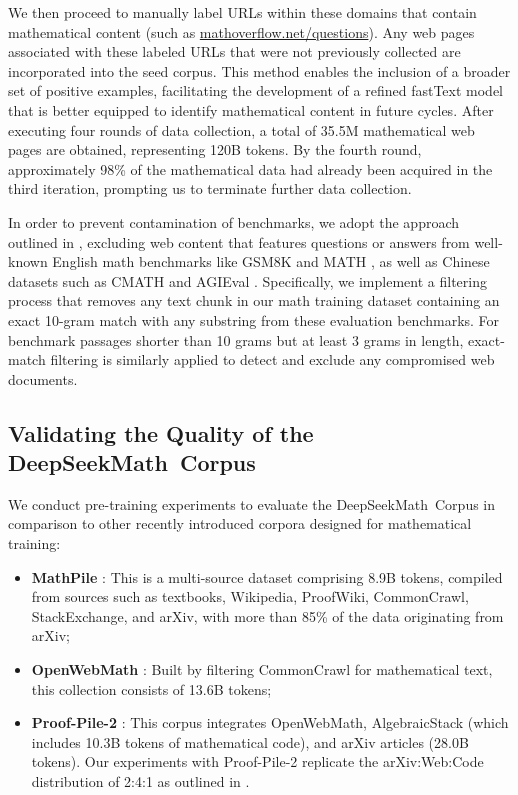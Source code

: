 \begin{itemize}[topsep=0pt]
We then proceed to manually label URLs within these domains that contain mathematical content (such as \url{mathoverflow.net/questions}). Any web pages associated with these labeled URLs that were not previously collected are incorporated into the seed corpus. This method enables the inclusion of a broader set of positive examples, facilitating the development of a refined fastText model that is better equipped to identify mathematical content in future cycles. After executing four rounds of data collection, a total of 35.5M mathematical web pages are obtained, representing 120B tokens. By the fourth round, approximately 98\% of the mathematical data had already been acquired in the third iteration, prompting us to terminate further data collection.

In order to prevent contamination of benchmarks, we adopt the approach outlined in \cite{deepseek-coder}, excluding web content that features questions or answers from well-known English math benchmarks like GSM8K \citep{gsm8k} and MATH \citep{MATH}, as well as Chinese datasets such as CMATH \citep{wei2023cmath} and AGIEval \citep{agieval}. Specifically, we implement a filtering process that removes any text chunk in our math training dataset containing an exact 10-gram match with any substring from these evaluation benchmarks. For benchmark passages shorter than 10 grams but at least 3 grams in length, exact-match filtering is similarly applied to detect and exclude any compromised web documents.

\subsection{Validating the Quality of the DeepSeekMath~Corpus}

We conduct pre-training experiments to evaluate the DeepSeekMath~Corpus in comparison to other recently introduced corpora designed for mathematical training:

\begin{itemize}[topsep=0pt]
    \item \textbf{MathPile} \citep{mathpile}: This is a multi-source dataset comprising 8.9B tokens, compiled from sources such as textbooks, Wikipedia, ProofWiki, CommonCrawl, StackExchange, and arXiv, with more than 85\% of the data originating from arXiv;
    \item \textbf{OpenWebMath} \citep{openwebmath}: Built by filtering CommonCrawl for mathematical text, this collection consists of 13.6B tokens;
    \item \textbf{Proof-Pile-2} \citep{llemma}: This corpus integrates OpenWebMath, AlgebraicStack (which includes 10.3B tokens of mathematical code), and arXiv articles (28.0B tokens). Our experiments with Proof-Pile-2 replicate the arXiv:Web:Code distribution of 2:4:1 as outlined in \cite{llemma}.
\end{itemize}


\end{itemize}
